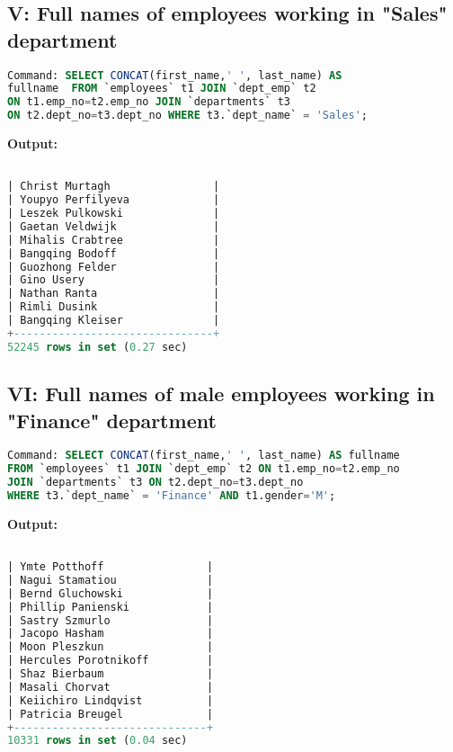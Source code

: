 \documentclass[12pt]{report}
\begin{document}
\subsection*{V: Full names of employees working in "Sales" department}

\begin{lstlisting}[language=sql]
Command: SELECT CONCAT(first_name,' ', last_name) AS 
fullname  FROM `employees` t1 JOIN `dept_emp` t2 
ON t1.emp_no=t2.emp_no JOIN `departments` t3 
ON t2.dept_no=t3.dept_no WHERE t3.`dept_name` = 'Sales';
\end{lstlisting}
\textbf{Output:}

\begin{lstlisting}[language=sql]

| Christ Murtagh                |
| Youpyo Perfilyeva             |
| Leszek Pulkowski              |
| Gaetan Veldwijk               |
| Mihalis Crabtree              |
| Bangqing Bodoff               |
| Guozhong Felder               |
| Gino Usery                    |
| Nathan Ranta                  |
| Rimli Dusink                  |
| Bangqing Kleiser              |
+-------------------------------+
52245 rows in set (0.27 sec)


\end{lstlisting}



\subsection*{VI: Full names of male employees working in "Finance" department}

\begin{lstlisting}[language=sql]
Command: SELECT CONCAT(first_name,' ', last_name) AS fullname  
FROM `employees` t1 JOIN `dept_emp` t2 ON t1.emp_no=t2.emp_no 
JOIN `departments` t3 ON t2.dept_no=t3.dept_no 
WHERE t3.`dept_name` = 'Finance' AND t1.gender='M';
\end{lstlisting}
\textbf{Output:}
\begin{lstlisting}[language=sql]

| Ymte Potthoff                |
| Nagui Stamatiou              |
| Bernd Gluchowski             |
| Phillip Panienski            |
| Sastry Szmurlo               |
| Jacopo Hasham                |
| Moon Pleszkun                |
| Hercules Porotnikoff         |
| Shaz Bierbaum                |
| Masali Chorvat               |
| Keiichiro Lindqvist          |
| Patricia Breugel             |
+------------------------------+
10331 rows in set (0.04 sec)
\end{lstlisting}
\end{document}

